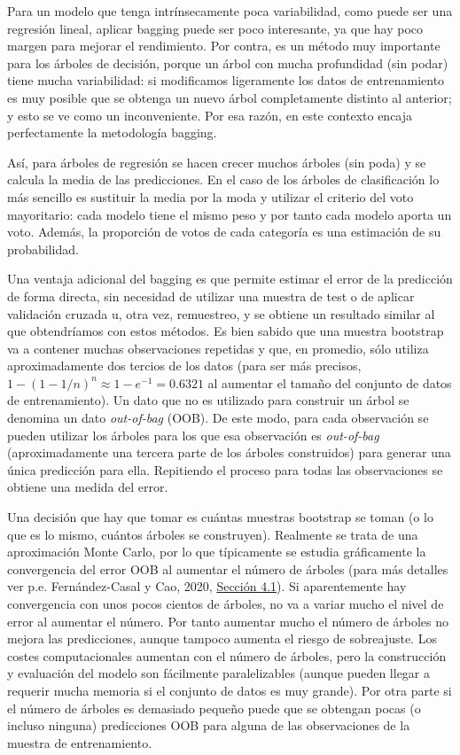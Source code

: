 \documentclass[
]{book}
\theoremstyle{break}
\theoremstyle{definition}
\theoremstyle{definition}
\theoremstyle{definition}
\theoremstyle{definition}
\theoremstyle{remark}
\begin{document}
Para un modelo que tenga intrínsecamente poca variabilidad, como puede ser una regresión lineal, aplicar bagging puede ser poco interesante, ya que hay poco margen para mejorar el rendimiento.
Por contra, es un método muy importante para los árboles de decisión, porque un árbol con mucha profundidad (sin podar) tiene mucha variabilidad: si modificamos ligeramente los datos de entrenamiento es muy posible que se obtenga un nuevo árbol completamente distinto al anterior; y esto se ve como un inconveniente.
Por esa razón, en este contexto encaja perfectamente la metodología bagging.

Así, para árboles de regresión se hacen crecer muchos árboles (sin poda) y se calcula la media de las predicciones.
En el caso de los árboles de clasificación lo más sencillo es sustituir la media por la moda y utilizar el criterio del voto mayoritario: cada modelo tiene el mismo peso y por tanto cada modelo aporta un voto.
Además, la proporción de votos de cada categoría es una estimación de su probabilidad.

Una ventaja adicional del bagging es que permite estimar el error de la predicción de forma directa, sin necesidad de utilizar una muestra de test o de aplicar validación cruzada u, otra vez, remuestreo, y se obtiene un resultado similar al que obtendríamos con estos métodos.
Es bien sabido que una muestra bootstrap va a contener muchas observaciones repetidas y que, en promedio, sólo utiliza aproximadamente dos tercios de los datos (para ser más precisos, \(1 - (1 - 1/n)^n \approx 1 - e^{-1} = 0.6321\) al aumentar el tamaño del conjunto de datos de entrenamiento).
Un dato que no es utilizado para construir un árbol se denomina un dato \emph{out-of-bag} (OOB).
De este modo, para cada observación se pueden utilizar los árboles para los que esa observación es \emph{out-of-bag} (aproximadamente una tercera parte de los árboles construidos) para generar una única predicción para ella.
Repitiendo el proceso para todas las observaciones se obtiene una medida del error.

Una decisión que hay que tomar es cuántas muestras bootstrap se toman (o lo que es lo mismo, cuántos árboles se construyen).
Realmente se trata de una aproximación Monte Carlo, por lo que típicamente se estudia gráficamente la convergencia del error OOB al aumentar el número de árboles (para más detalles ver p.e. Fernández-Casal y Cao, 2020, \href{https://rubenfcasal.github.io/simbook/convergencia.html}{Sección 4.1}).
Si aparentemente hay convergencia con unos pocos cientos de árboles, no va a variar mucho el nivel de error al aumentar el número.
Por tanto aumentar mucho el número de árboles no mejora las predicciones, aunque tampoco aumenta el riesgo de sobreajuste.
Los costes computacionales aumentan con el número de árboles, pero la construcción y evaluación del modelo son fácilmente paralelizables (aunque pueden llegar a requerir mucha memoria si el conjunto de datos es muy grande).
Por otra parte si el número de árboles es demasiado pequeño puede que se obtengan pocas (o incluso ninguna) predicciones OOB para alguna de las observaciones de la muestra de entrenamiento.
\end{document}

